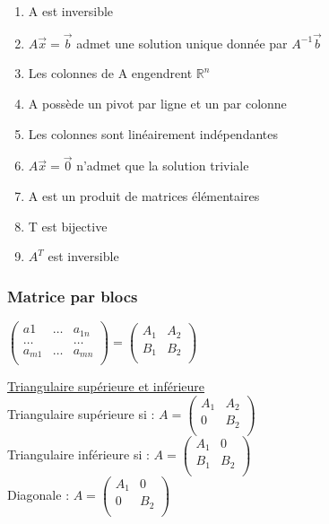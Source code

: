 \documentclass[../main.tex]{subfiles}
\begin{document}
\begin{enumerate}
    \item A est inversible\\
    \item $A\vec{x} = \vec{b}$ admet une solution unique donnée par $A^{-1} \vec{b}$\\
    \item Les colonnes de A engendrent $\mathbb{R}^n$\\
    \item A possède un pivot par ligne et un par colonne\\
    \item Les colonnes sont linéairement indépendantes\\
    \item $A\vec{x} = \vec{0}$ n'admet que la solution triviale\\
    \item A est un produit de matrices élémentaires\\
    \item T est bijective\\
    \item $A^T$ est inversible\\
\end{enumerate}

\subsubsection{Matrice par blocs}
$\begin{pmatrix}
    a1 & \dots & a_{1n}\\
    \dots & & \dots\\
    a_{m1} & \dots & a_{mn}\\
\end{pmatrix} = 
\begin{pmatrix}
    A_1 & A_2\\
    B_1 & B_2\\
\end{pmatrix}$

\quad \underline{Triangulaire supérieure et inférieure}\\
Triangulaire supérieure si : $A = \begin{pmatrix}
    A_1 & A_2 \\
    0 & B_2\\
\end{pmatrix}$\\
Triangulaire inférieure si : $A = \begin{pmatrix}
    A_1 & 0\\
    B_1 & B_2\\
\end{pmatrix}$\\
Diagonale : $A = \begin{pmatrix}
    A_1 & 0\\
    0 & B_2\\
\end{pmatrix}$
\end{document}
